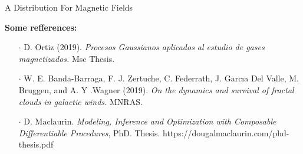 \documentclass{beamer}
\begin{document}
\begin{frame}{A Distribution For Magnetic Fields}

  \textbf{Some refferences:}

  \vspace{1em}

  \begin{itemize}
    \item[$\cdot$] D. Ortiz (2019). \emph{Procesos Gaussianos aplicados al estudio de gases magnetizados.} Msc Thesis.
    \item[$\cdot$] W. E. Banda-Barraga, F. J. Zertuche, C. Federrath, J. Garcıa Del Valle, M. Bruggen, and A. Y .Wagner (2019). \emph{On the dynamics and survival of fractal clouds in galactic winds.} MNRAS.
    \item[$\cdot$] D. Maclaurin. \emph{Modeling, Inference and Optimization with Composable Differentiable Procedures}, PhD. Thesis. https://dougalmaclaurin.com/phd-thesis.pdf
  \end{itemize}
\end{frame}
\end{document}
